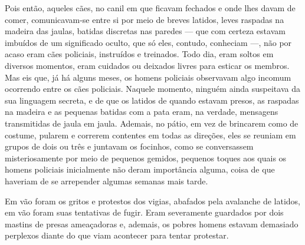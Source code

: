 Pois então, aqueles cães, no canil em que ficavam fechados e onde lhes
davam de comer, comunicavam-se entre si por meio de breves latidos,
leves raspadas na madeira das jaulas, batidas discretas nas paredes ---
que com certeza estavam imbuídos de um significado oculto, que só eles,
contudo, conheciam ---, não por acaso eram cães policiais, instruídos e
treinados. Todo dia, eram soltos em diversos momentos, eram cuidados ou
deixados livres para esticar os membros. Mas eis que, já há alguns
meses, os homens policiais observavam algo incomum ocorrendo entre os
cães policiais. Naquele momento, ninguém ainda suspeitava da sua
linguagem secreta, e de que os latidos de quando estavam presos, as
raspadas na madeira e as pequenas batidas com a pata eram, na verdade,
mensagens transmitidas de jaula em jaula. Ademais, no pátio, em vez de
brincarem como de costume, pularem e correrem contentes em todas as
direções, eles se reuniam em grupos de dois ou três e juntavam os
focinhos, como se conversassem misteriosamente por meio de pequenos
gemidos, pequenos toques aos quais os homens policiais inicialmente não
deram importância alguma, coisa de que haveriam de se arrepender algumas
semanas mais tarde.


Em vão foram os gritos e protestos dos vigias, abafados pela avalanche
de latidos, em vão foram suas tentativas de fugir. Eram severamente
guardados por dois mastins de presas ameaçadoras e, ademais, os pobres
homens estavam demasiado perplexos diante do que viam acontecer para
tentar protestar.

